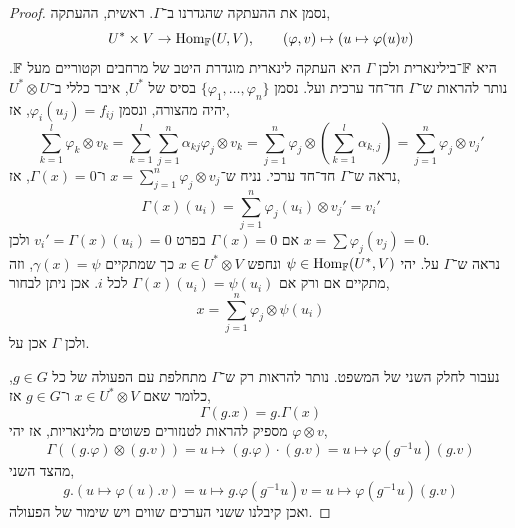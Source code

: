 \begin{proof}
	נסמן את ההעתקה שהגדרנו ב־$\Gamma$.
	ראשית, ההעתקה,
	\[
		U^* \times V \to \operatorname{Hom}_{\mathbb{F}}(U, V),
		\qquad
		(\varphi, v) \mapsto (u \mapsto \varphi(u) v)
	\]
	היא $\mathbb{F}$־בילינארית ולכן $\Gamma$ היא העתקה לינארית מוגדרת היטב של מרחבים וקטוריים מעל $\mathbb{F}$.
	נותר להראות ש־$\Gamma$ חד־חד ערכית ועל.
	נסמן $\{ \varphi_1, \ldots, \varphi_n \}$ בסיס של $U^*$, איבר כללי ב־$U^* \otimes U$ יהיה מהצורה,
	ונסמן $\varphi_i(u_j) = f_{i j}$, אז,
	\[
		\sum_{k = 1}^l \varphi_k \otimes v_k
		= \sum_{k = 1}^l \sum_{j = 1}^n \alpha_{k j} \varphi_j \otimes v_k
		= \sum_{j = 1}^n \varphi_j \otimes (\sum_{k = 1}^l \alpha_{k, j})
		= \sum_{j = 1}^n \varphi_j \otimes v_j'
	\]
	נראה ש־$\Gamma$ חד־חד ערכי.
	נניח ש־$x = \sum_{j = 1}^n \varphi_j \otimes v_j$ ו־$\Gamma(x) = 0$, אז,
	\[
		\Gamma(x)(u_i)
		= \sum_{j = 1}^n \varphi_j(u_i) \otimes v_j'
		= v_i'
	\]
	אם $\Gamma(x) = 0$ בפרט $v_i' = \Gamma(x)(u_i) = 0$ ולכן $x = \sum \varphi_j(v_j) = 0$. \\
	נראה ש־$\Gamma$ על.
	יהי $\psi \in \operatorname{Hom}_{\mathbb{F}}(U^*, V)$ ונחפש $x \in U^* \otimes V$ כך שמתקיים $\gamma(x) = \psi$, וזה מתקיים אם ורק אם $\Gamma(x)(u_i) = \psi(u_i)$ לכל $i$.
	אכן ניתן לבחור,
	\[
		x
		= \sum_{j = 1}^n \varphi_j \otimes \psi(u_i)
	\]
	ולכן $\Gamma$ אכן על.

	נעבור לחלק השני של המשפט.
	נותר להראות רק ש־$\Gamma$ מתחלפת עם הפעולה של כל $g \in G$, כלומר שאם $x \in U^* \otimes V$ ו־$g \in G$ אז,
	\[
		\Gamma(g . x)
		= g . \Gamma(x)
	\]
	מספיק להראות לטנזורים פשוטים מלינאריות, אז יהי $\varphi \otimes v$,
	\[
		\Gamma((g . \varphi) \otimes (g . v))
		= u \mapsto (g . \varphi) \cdot (g . v)
		= u \mapsto \varphi(g^{-1} u) (g . v)
	\]
	מהצד השני,
	\[
		g . (u \mapsto \varphi(u) . v)
		= u \mapsto g . \varphi(g^{-1} u) v
		= u \mapsto \varphi(g^{-1} u) (g . v)
	\]
	ואכן קיבלנו ששני הערכים שווים ויש שימור של הפעולה.
\end{proof}


